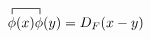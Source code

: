 \documentclass[margin=3pt]{standalone}
\begin{document}
\fontsize{14}{16}
$\displaystyle
\contraction[1ex]{}{\phi}{(x)}{\phi}
\phi(x) \phi(y)
= D_F(x - y)
$
    
\end{document}
